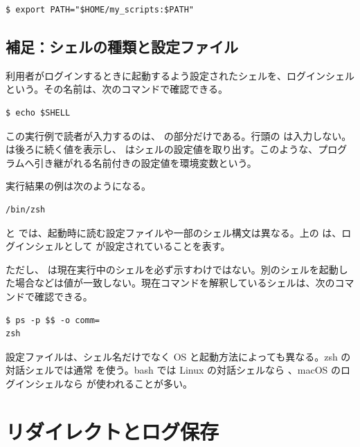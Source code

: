 \begin{lstlisting}[numbers=none, xleftmargin=2\zw]
$ export PATH="$HOME/my_scripts:$PATH"
\end{lstlisting}

\subsection{補足：シェルの種類と設定ファイル}
\label{subsec:shell-kind}

利用者がログインするときに起動するよう設定されたシェルを、ログインシェルという。その名前は、次のコマンドで確認できる。

\begin{lstlisting}[numbers=none, xleftmargin=2\zw]
$ echo $SHELL
\end{lstlisting}

この実行例で読者が入力するのは、 の部分だけである。行頭の \code{\$} は入力しない。 は後ろに続く値を表示し、 はシェルの設定値を取り出す。このような、プログラムへ引き継がれる名前付きの設定値を環境変数という。

実行結果の例は次のようになる。

\begin{lstlisting}[numbers=none, xleftmargin=2\zw]
/bin/zsh
\end{lstlisting}

 と  では、起動時に読む設定ファイルや一部のシェル構文は異なる。上の  は、ログインシェルとして  が設定されていることを表す。

ただし、 は現在実行中のシェルを必ず示すわけではない。別のシェルを起動した場合などは値が一致しない。現在コマンドを解釈しているシェルは、次のコマンドで確認できる。

\begin{lstlisting}[numbers=none, xleftmargin=2\zw]
$ ps -p $$ -o comm=
zsh
\end{lstlisting}

設定ファイルは、シェル名だけでなく OS と起動方法によっても異なる。zsh の対話シェルでは通常  を使う。bash では Linux の対話シェルなら 、macOS のログインシェルなら  が使われることが多い。

\section{リダイレクトとログ保存}

